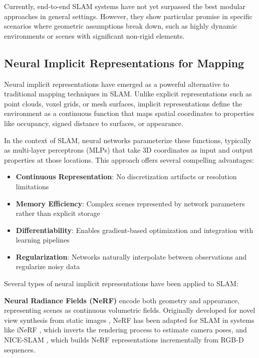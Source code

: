 \documentclass[12pt]{article}
\begin{document}
    Currently, end-to-end SLAM systems have not yet surpassed the best modular approaches in general settings. However, they show particular promise in specific scenarios where geometric assumptions break down, such as 
    highly dynamic environments or scenes with significant non-rigid elements.
    
    \subsection{Neural Implicit Representations for Mapping}
    
    Neural implicit representations have emerged as a powerful alternative to traditional mapping techniques in SLAM. Unlike explicit representations such as point clouds, voxel grids, or mesh surfaces, implicit representations 
    define the environment as a continuous function that maps spatial coordinates to properties like occupancy, signed distance to surfaces, or appearance.
    
    In the context of SLAM, neural networks parameterize these functions, typically as multi-layer perceptrons (MLPs) that take 3D coordinates as input and output properties at those locations. This approach offers several compelling advantages:
    
    \begin{itemize}
        \item \textbf{Continuous Representation}: No discretization artifacts or resolution limitations
        \item \textbf{Memory Efficiency}: Complex scenes represented by network parameters rather than explicit storage
        \item \textbf{Differentiability}: Enables gradient-based optimization and integration with learning pipelines
        \item \textbf{Regularization}: Networks naturally interpolate between observations and regularize noisy data
    \end{itemize}
    
    Several types of neural implicit representations have been applied to SLAM:
    
    \textbf{Neural Radiance Fields (NeRF)} encode both geometry and appearance, representing scenes as continuous volumetric fields. Originally developed for novel view synthesis from static images \cite{nerf_paper}, NeRF has been adapted for SLAM in 
    systems like iNeRF \cite{inerf}, which inverts the rendering process to estimate camera poses, and NICE-SLAM \cite{nice-slam}, which builds NeRF representations incrementally from RGB-D sequences.
    
\end{document}
